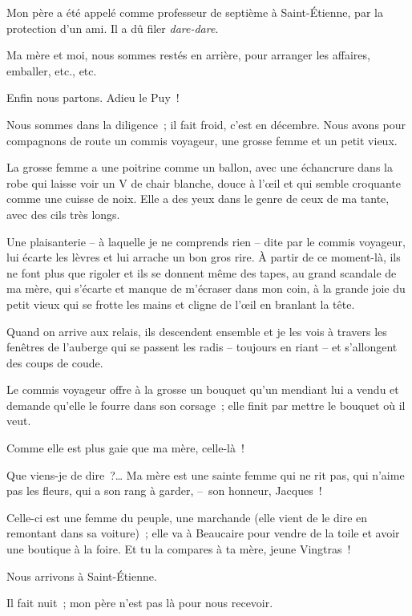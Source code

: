 \documentclass[french,twoside]{book} %
\begin{document}
\noindent Mon père a été appelé comme professeur de septième à Saint-Étienne, par la protection d’un ami. Il a dû filer \emph{dare-dare}.\par
Ma mère et moi, nous sommes restés en arrière, pour arranger les affaires, emballer, etc., etc.\par
\bigbreak
\noindent Enfin nous partons. Adieu le Puy !\par
\bigbreak
\noindent Nous sommes dans la diligence ; il fait froid, c’est en décembre. Nous avons pour compagnons de route un commis voyageur, une grosse femme et un petit vieux.\par
La grosse femme a une poitrine comme un ballon, avec une échancrure dans la robe qui laisse voir un V de chair blanche, douce à l’œil et qui semble croquante comme une cuisse de noix. Elle a des yeux dans le genre de ceux de ma tante, avec des cils très longs.\par
Une plaisanterie – à laquelle je ne comprends rien – dite par le commis voyageur, lui écarte les lèvres et lui arrache un bon gros rire. À partir de ce moment-là, ils ne font plus que rigoler et ils se donnent même des tapes, au grand scandale de ma mère, qui s’écarte et manque de m’écraser dans mon coin, à la grande joie du petit vieux qui se frotte les mains et cligne de l’œil en branlant la tête.\par
Quand on arrive aux relais, ils descendent ensemble et je les vois à travers les fenêtres de l’auberge qui se passent les radis – toujours en riant – et s’allongent des coups de coude.\par
Le commis voyageur offre à la grosse un bouquet qu’un mendiant lui a vendu et demande qu’elle le fourre dans son corsage ; elle finit par mettre le bouquet où il veut.\par
Comme elle est plus gaie que ma mère, celle-là !\par
Que viens-je de dire ?… Ma mère est une sainte femme qui ne rit pas, qui n’aime pas les fleurs, qui a son rang à garder, – son honneur, Jacques !\par
Celle-ci est une femme du peuple, une marchande (elle vient de le dire en remontant dans sa voiture) ; elle va à Beaucaire pour vendre de la toile et avoir une boutique à la foire. Et tu la compares à ta mère, jeune Vingtras !\par
\bigbreak
\noindent Nous arrivons à Saint-Étienne.\par
\bigbreak
\noindent Il fait nuit ; mon père n’est pas là pour nous recevoir.\par
\end{document}
